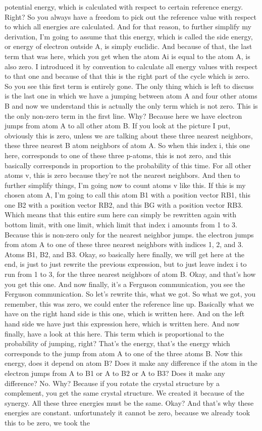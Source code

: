 potential energy, which is calculated with respect to certain reference energy. Right? So you always have a freedom to pick out the reference value with respect to which all energies are calculated. And for that reason, to further simplify my derivation, I'm going to assume that this energy, which is called the side energy, or energy of electron outside A, is simply euclidic. And because of that, the last term that was here, which you get when the atom Ai is equal to the atom A, is also zero. I introduced it by convention to calculate all energy values with respect to that one and because of that this is the right part of the cycle which is zero. So you see this first term is entirely gone. The only thing which is left to discuss is the last one in which we have a jumping between atom A and four other atoms B and now we understand this is actually the only term which is not zero. This is the only non-zero term in the first line. Why? Because here we have electron jumps from atom A to all other atom B. If you look at the picture I put, obviously this is zero, unless we are talking about these three nearest neighbors, these three nearest B atom neighbors of atom A. So when this index i, this one here, corresponds to one of these three p-atoms, this is not zero, and this basically corresponds in proportion to the probability of this time. For all other atoms v, this is zero because they're not the nearest neighbors. And then to further simplify things, I'm going now to count atoms v like this. If this is my chosen atom A, I'm going to call this atom B1 with a position vector RB1, this one B2 with a position vector RB2, and this BG with a position vector RB3. Which means that this entire sum here can simply be rewritten again with bottom limit, with one limit, which limit that index i amounts from 1 to 3. Because this is non-zero only for the nearest neighbor jumps. the electron jumps from atom A to one of these three nearest neighbors with indices 1, 2, and 3. Atoms B1, B2, and B3. Okay, so basically here finally, we will get here at the end, is just to just rewrite the previous expression, but to just leave index i to run from 1 to 3, for the three nearest neighbors of atom B. Okay, and that's how you get this one. And now finally, it's a Ferguson communication, you see the Ferguson communication. So let's rewrite this, what we got. So what we got, you remember, this was zero, we could enter the reference line up. Basically what we have on the right hand side is this one, which is written here. And on the left hand side we have just this expression here, which is written here. And now finally, have a look at this here. This term which is proportional to the probability of jumping, right? That's the energy, that's the energy which corresponds to the jump from atom A to one of the three atoms B. Now this energy, does it depend on atom B? Does it make any difference if the atom in the electron jumps from A to B1 or A to B2 or A to B3? Does it make any difference? No. Why? Because if you rotate the crystal structure by a complement, you get the same crystal structure. We created it because of the synergy. All these three energies must be the same. Okay? And that's why these energies are constant. unfortunately it cannot be zero, because we already took this to be zero, we took the 